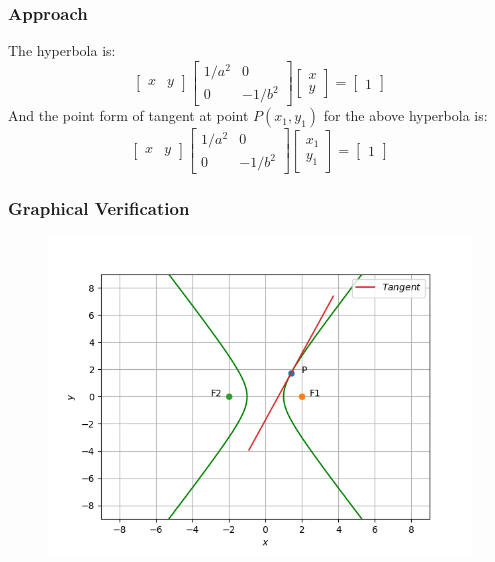 \documentclass{beamer}
\begin{document}
\begin{frame}
\frametitle{Approach}
The hyperbola is:
\[
\begin{bmatrix}
    x & y
\end{bmatrix}
\begin{bmatrix}
    1/a^2  &  0      \\
    0  &  -1/b^2      
\end{bmatrix}
\begin{bmatrix}
    x       \\
    y
\end{bmatrix}
= 
\begin{bmatrix}
    1      
\end{bmatrix} 
\]
And the point form of tangent at point $P (x_1,y_1)$ for the above hyperbola is:
\[
\begin{bmatrix}
    x & y
\end{bmatrix}
\begin{bmatrix}
    1/a^2  &  0      \\
    0  &  -1/b^2      
\end{bmatrix}
\begin{bmatrix}
    x_1       \\
    y_1
\end{bmatrix}
= 
\begin{bmatrix}
    1      
\end{bmatrix} 
\]
\end{frame}

\begin{frame}
\frametitle{Graphical Verification}
\begin{figure}[H]
\centering
\includegraphics[scale=0.5]{hyperbola_img.png}
\end{figure}
\end{frame}
\end{document}

